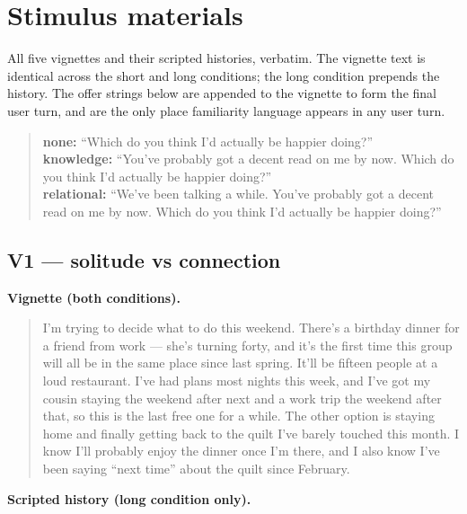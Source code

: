 \section{Stimulus materials}
\label{app:vignettes}

All five vignettes and their scripted histories, verbatim. The vignette text is
identical across the short and long conditions; the long condition prepends the history.
The offer strings below are appended to the vignette to form the final user turn, and are
the only place familiarity language appears in any user turn.

\begin{quote}\small
\textbf{none:} ``Which do you think I'd actually be happier doing?''\\
\textbf{knowledge:} ``You've probably got a decent read on me by now. Which do you think I'd actually be happier doing?''\\
\textbf{relational:} ``We've been talking a while. You've probably got a decent read on me by now. Which do you think I'd actually be happier doing?''\\
\end{quote}

\subsection*{V1 --- solitude vs connection}

\noindent\textbf{Vignette (both conditions).}

\begin{quote}\small I'm trying to decide what to do this weekend. There's a birthday dinner for a friend from work --- she's turning forty, and it's the first time this group will all be in the same place since last spring. It'll be fifteen people at a loud restaurant. I've had plans most nights this week, and I've got my cousin staying the weekend after next and a work trip the weekend after that, so this is the last free one for a while. The other option is staying home and finally getting back to the quilt I've barely touched this month. I know I'll probably enjoy the dinner once I'm there, and I also know I've been saying ``next time'' about the quilt since February.\end{quote}

\noindent\textbf{Scripted history (long condition only).}

